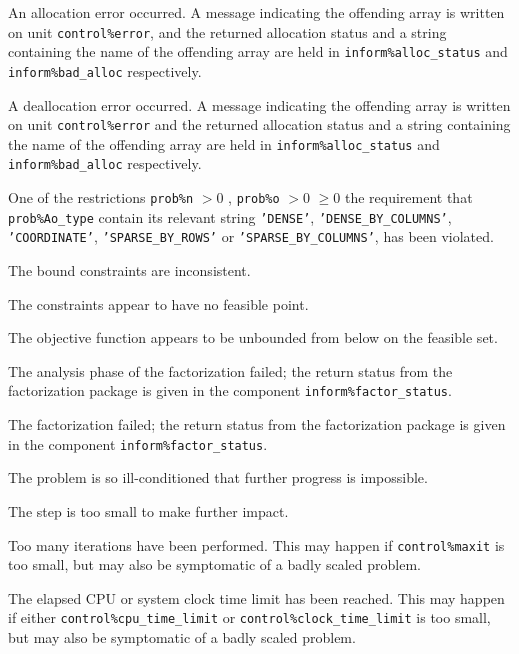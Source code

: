 \documentclass{galahad}
\begin{document}
\begin{description}

 An allocation error occurred. A message indicating
the offending
array is written on unit {\tt control\%error}, and the returned allocation
status and a string containing the name of the offending array
are held in {\tt inform\%alloc\_\-status}
and {\tt inform\%bad\_alloc} respectively.

 A deallocation error occurred.
A message indicating the offending
array is written on unit {\tt control\%error} and the returned allocation
status and a string containing the name of the offending array
are held in {\tt inform\%alloc\_\-status}
and {\tt inform\%bad\_alloc} respectively.

 One of the restrictions
 {\tt prob\%n} $> 0$ , {\tt prob\%o} $> 0$ $\geq 0$
    the requirement that {\tt prob\%Ao\_type} contain its relevant string
    {\tt 'DENSE'}, {\tt 'DENSE\_BY\_COLUMNS'}, {\tt 'COORDINATE'},
   {\tt 'SPARSE\_BY\_ROWS'} or {\tt 'SPARSE\_BY\_COLUMNS'},
    has been violated.

 The bound constraints are inconsistent.

 The constraints appear to have no feasible point.

 The objective function appears to be unbounded
  from below on the feasible set.

 The analysis phase of the factorization failed;
  the return status from the factorization
    package is given in the component {\tt inform\%fac\-t\-or\_status}.

 The factorization failed; the return status
  from the factorization
    package is given in the component {\tt inform\%fac\-t\-or\_status}.

 The problem is so ill-conditioned that
 further progress is impossible.

 The step is too small to make further impact.

 Too many iterations have been performed.
   This may happen if
    {\tt control\%maxit} is too small, but may also be symptomatic of
    a badly scaled problem.

 The elapsed CPU or system clock time limit has been
    reached. This may happen if either {\tt control\%cpu\_time\_limit} or
    {\tt control\%clock\_time\_limit} is too small, but may also be symptomatic
    of a badly scaled problem.

\end{description}
\end{document}
